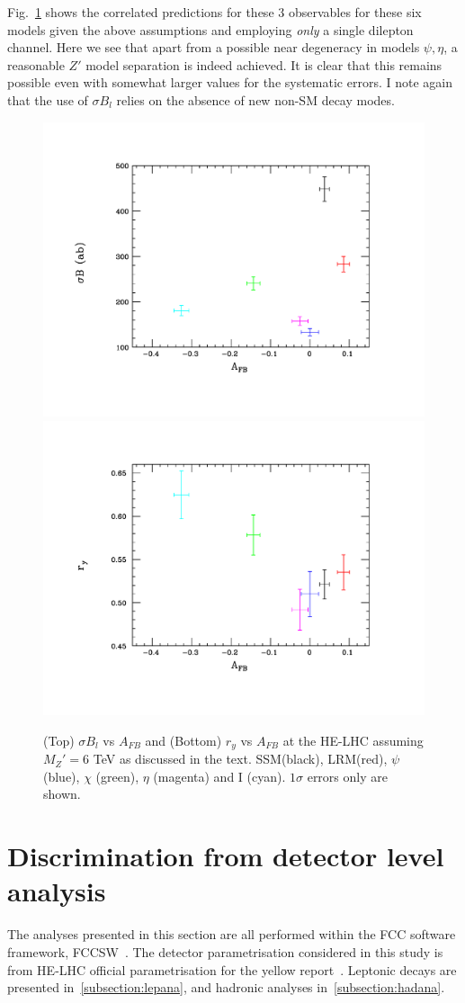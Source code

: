 \documentclass[14pt]{article}
\begin{document}
Fig.~\ref{toy3} shows the correlated predictions for these 3 observables for these six models given the above assumptions and employing {\it only} a single dilepton 
channel. Here we see that apart from a possible near degeneracy in models $\psi,\eta$, a reasonable $Z'$ model separation is indeed achieved. It is clear that this 
remains possible even with somewhat larger values for the systematic errors. I note again that the use of $\sigma B_l$ relies on the absence of new non-SM decay 
modes.



\begin{figure}[htbp]
  \centering
\includegraphics[trim={2cm 2cm 2cm 2cm},clip,width=0.49\columnwidth]{figures/compare2.pdf}
\includegraphics[trim={2cm 2cm 2cm 2cm},clip,width=0.49\columnwidth]{figures/compare3.pdf}
\caption{(Top) $\sigma B_l$ vs $A_{FB}$ and (Bottom) $r_y$ vs $A_{FB}$ at the HE-LHC assuming $M_Z'=6$ TeV as discussed in the text. 
SSM(black), LRM(red), $\psi$ (blue), $\chi$ (green), $\eta$ (magenta) and I (cyan). $1\sigma$ errors only are shown. }
\label{toy3}
\end{figure}




\section{Discrimination from detector level analysis}
The analyses presented in this section are all performed within the FCC software framework, FCCSW~\cite{fccsw}.
The detector parametrisation considered in this study is from HE-LHC official parametrisation for the yellow report~\cite{HELHCtwiki}.
Leptonic decays are presented in~\ref{subsection:lepana}, and hadronic analyses in~\ref{subsection:hadana}.
\end{document}
